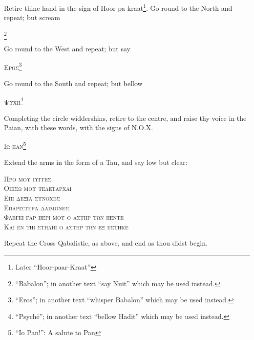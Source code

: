 Retire thine hand in the sign of Hoor pa kraat\footnote{Later \enquote{Hoor-paar-Kraat}}. Go round to the North and repeat; but scream \begin{quoting}[indentfirst=false]\textsc{\GreekBabalon}\footnote{\enquote{Babalon}; in another text \enquote{say Nuit} which may be used instead.} \end{quoting}

Go round to the West and repeat; but say \begin{quoting}[indentfirst=false]\textsc{Ερωσ}\footnote{\enquote{Eros}; in another text \enquote{whisper Babalon} which may be used instead.} \end{quoting}

Go round to the South and repeat; but bellow \begin{quoting}[indentfirst=false]\textsc{Ψυχη}\footnote{\enquote{Psych\=e}; in another text \enquote{bellow Hadit} which may be used instead.} \end{quoting}

Completing the circle widdershins, retire to the centre, and raise thy voice in the Paian, with these words, with the signs of N.O.X. \begin{quoting}[indentfirst=false]\textsc{Ιω παν}\footnote{\enquote{Io Pan!}: A salute to Pan}\end{quoting}

Extend the arms in the form of a Tau, and say low but clear:

\begin{quoting}[indentfirst=false]
\textsc{Προ μου ιυγγεσ} \\
\textsc{Οπισω μου τελεταρχαι} \\
\textsc{Επι δεξια συνοχεσ} \\
\textsc{Επαριστερα δαιμονεσ} \\
\textsc{Φλεγει γαρ περι μου ο αστηρ των πεντε} \\
\textsc{Και εν τηι στηληι ο αστηρ των εξ εστηκε}\footnotemark
\end{quoting}

Repeat the Cross Qabalistic, as above, and end as thou didst begin.
